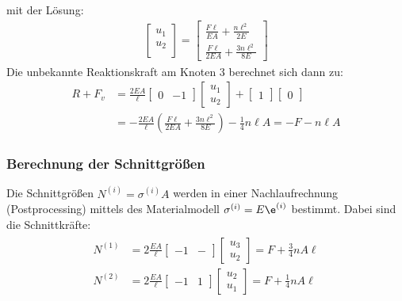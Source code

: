 \documentclass[letterpaper,10pt,german]{jupyterBook}
\begin{document}
\sphinxAtStartPar
mit der Lösung:
\label{equation:chapters/chapter2/1dFEM:47e5f1ef-69cb-42b8-b6ca-12465490e1a0}\begin{align}
\begin{bmatrix}
u_1 \\
u_2\\
\end{bmatrix} = \begin{bmatrix}
 \frac{F\ell}{EA} + \frac{n \ell^2}{2E}\\
\frac{F\ell}{2EA} + \frac{3 n \ell^2}{8E}
\end{bmatrix} 
\end{align}
\sphinxAtStartPar
Die unbekannte Reaktionskraft am Knoten 3 berechnet sich dann zu:
\label{equation:chapters/chapter2/1dFEM:b5f7695e-258e-4330-9f04-28eda736cd6c}\begin{align}
R + F_v & = \frac{2EA}{\ell} \begin{bmatrix}
0 & -1 
\end{bmatrix} \begin{bmatrix}
u_1 \\ u_2
\end{bmatrix} + \begin{bmatrix}
1
\end{bmatrix} \begin{bmatrix}
0
\end{bmatrix} \\
&= -\frac{2EA}{\ell} \left(\frac{F\ell}{2EA} + \frac{3 n \ell^2}{8E} \right)- \frac{1}{4}n\ell A= -F - n \ell A 
\end{align}

\subsubsection{Berechnung der Schnittgrößen}
\label{\detokenize{chapters/chapter2/1dFEM:berechnung-der-schnittgroszen}}
\sphinxAtStartPar
Die Schnittgrößen \(N^{(i)}=\sigma^{(i)} A\) werden in einer Nachlaufrechnung (Postprocessing) mittels des Materialmodell \(\sigma^{(i)}=E\e^{(i)}\) bestimmt. Dabei sind die Schnittkräfte:
\begin{equation}\label{equation:chapters/chapter2/1dFEM:postproc}
\begin{split}\begin{align}
N^{(1)} & = 2\frac{EA}{\ell} \begin{bmatrix} -1 & - \end{bmatrix} \begin{bmatrix} u_3 \\ u_2 \end{bmatrix} = F + \frac{3}{4} n A \ell \\
N^{(2)} & = 2\frac{EA}{\ell} \begin{bmatrix} -1 & 1 \end{bmatrix} \begin{bmatrix} u_2 \\ u_1 \end{bmatrix}= F + \frac{1}{4} n A \ell
\end{align}\end{split}
\end{equation}
\end{document}
